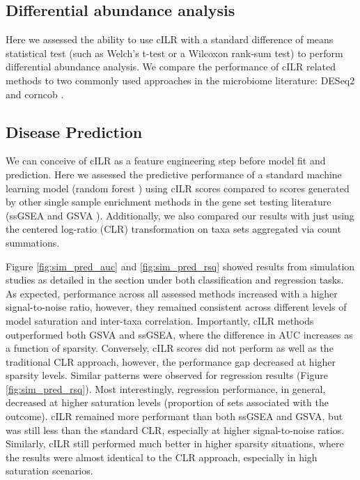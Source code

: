 \documentclass[10pt,letterpaper]{article}
\begin{document}
\subsection*{Differential abundance analysis}
Here we assessed the ability to use cILR with a standard difference of means statistical test (such as Welch's t-test or a Wilcoxon rank-sum test) to perform differential abundance analysis. We compare the performance of cILR related methods to two commonly used approaches in the microbiome literature: DESeq2 \cite{love2014} and corncob \cite{martin2020}.   

\subsection*{Disease Prediction} 
We can conceive of cILR as a feature engineering step before model fit and prediction. Here we assessed the predictive performance of a standard machine learning model (random forest \cite{breiman2001}) using cILR scores compared to scores generated by other single sample enrichment methods in the gene set testing literature (ssGSEA \cite{barbie2009} and GSVA \cite{hanzelmann2013}). Additionally, we also compared our results with just using the centered log-ratio (CLR) transformation on taxa sets aggregated via count summations.    

Figure \ref{fig:sim_pred_auc} and \ref{fig:sim_pred_rsq} showed results from simulation studies as detailed in the  section under both classification and regression tasks. As expected, performance across all assessed methods increased with a higher signal-to-noise ratio, however, they remained consistent across different levels of model saturation and inter-taxa correlation. Importantly, cILR methods outperformed both GSVA and ssGSEA, where the difference in AUC increases as a function of sparsity. Conversely, cILR scores did not perform as well as the traditional CLR approach, however, the performance gap decreased at higher sparsity levels. Similar patterns were observed for regression results (Figure \ref{fig:sim_pred_rsq}). Most interestingly, regression performance, in general, decreased at higher saturation levels (proportion of sets associated with the outcome). cILR remained more performant than both ssGSEA and GSVA, but was still less than the standard CLR, especially at higher signal-to-noise ratios. Similarly, cILR still performed much better in higher sparsity situations, where the results were almost identical to the CLR approach, especially in high saturation scenarios.     
\end{document}
